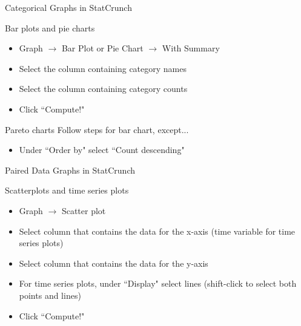 \documentclass[aspectratio=169]{beamer}
\begin{document}
\begin{frame}{Categorical Graphs in StatCrunch}

\begin{block}{Bar plots and pie charts}
\begin{itemize}
\item Graph $\to$ Bar Plot or Pie Chart $\to$ With Summary
\item Select the column containing category names
\item Select the column containing category counts
\item Click ``Compute!"
\end{itemize}
\end{block}


\begin{block}{Pareto charts}
Follow steps for bar chart, except...
\begin{itemize}
\item Under ``Order by" select ``Count descending"
\end{itemize}
\end{block}
\end{frame}

\begin{frame}{Paired Data Graphs in StatCrunch}
\begin{block}{Scatterplots and time series plots}
\begin{itemize}
\item Graph $\to$ Scatter plot
\item Select column that contains the data for the x-axis (time variable for time series plots)
\item Select column that contains the data for the y-axis
\item For time series plots, under ``Display" select lines (shift-click to select both points and lines)
\item Click ``Compute!"
\end{itemize}
\end{block}

\end{frame}
\end{document}
